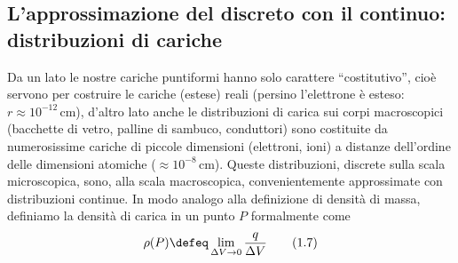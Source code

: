 \subsection{L'approssimazione del discreto con il continuo: distribuzioni di cariche}

Da un lato le nostre cariche puntiformi hanno solo carattere ``costitutivo'', cioè servono per costruire le cariche (estese) reali (persino l'elettrone è esteso: $r\approx10^{-12}\,\mathrm{cm}$), d'altro lato anche le distribuzioni di carica sui corpi macroscopici (bacchette di vetro, palline di sambuco, conduttori) sono costituite da numerosissime cariche di piccole dimensioni (elettroni, ioni) a distanze dell'ordine delle dimensioni atomiche ($\approx10^{-8}\,\mathrm{cm}$). Queste distribuzioni, discrete sulla scala microscopica, sono, alla scala macroscopica, convenientemente approssimate con distribuzioni continue. In modo analogo alla definizione di densità di massa, definiamo la densità di carica in un punto $P$ formalmente come
\begin{equation}
\rho(P)\defeq\lim_{\Delta V\to0}\frac{q}{\Delta V}
\tag{1.7}
\end{equation}
